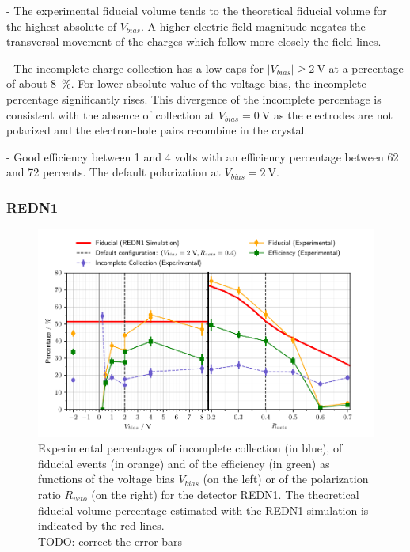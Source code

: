 - The experimental fiducial volume tends to the theoretical fiducial volume for the highest absolute of $V_{bias}$. A higher electric field magnitude negates the transversal movement of the charges which follow more closely the field lines.

- The incomplete charge collection has a low caps for $| V_{bias} | \geq \SI{2}{\volt}$ at a percentage of about \SI{8}{\percent}. For lower absolute value of the voltage bias, the incomplete percentage significantly rises. This divergence of the incomplete percentage is consistent with the absence of collection at $V_{bias}=\SI{0}{\volt}$ as the electrodes are not polarized and the electron-hole pairs recombine in the crystal.

- Good efficiency between 1 and 4 volts with an efficiency percentage between 62 and 72 percents. The default polarization at $V_{bias} = \SI{2}{\volt}$.


\subsubsection{REDN1}

\begin{figure}
\centering
\includegraphics[scale=1]{Figures/ElectrodesExperimental/redn1_experimental_fiducial_volume.pdf}
\caption{Experimental percentages of incomplete collection (in blue), of fiducial events (in orange) and of the efficiency (in green) as functions of the voltage bias $V_{bias}$ (on the left) or of the polarization ratio $R_{veto}$ (on the right) for the detector REDN1. The theoretical fiducial volume percentage estimated with the REDN1 simulation is indicated by the red lines. \\
{\color{red} TODO: correct the error bars}}
\label{fig:redn1-experimental-fiducial-volume}
\end{figure}

